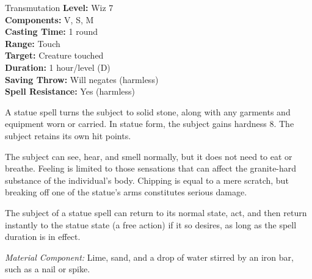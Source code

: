 {Transmutation}
{
	\textbf{Level:}
	Wiz 7\\
	\textbf{Components:}
	V, S, M\\
	\textbf{Casting Time:}
	1 round\\
	\textbf{Range:}
	Touch\\
	\textbf{Target:}
	Creature touched\\
	\textbf{Duration:}
	1 hour/level (D)\\
	\textbf{Saving Throw:}
	Will negates (harmless)\\
	\textbf{Spell Resistance:}
	Yes (harmless)\\
}
{
	A statue spell turns the subject to solid stone, along with any garments and equipment worn or carried. In statue form, the subject gains hardness 8. The subject retains its own hit points.

	The subject can see, hear, and smell normally, but it does not need to eat or breathe. Feeling is limited to those sensations that can affect the granite-hard substance of the individual's body. Chipping is equal to a mere scratch, but breaking off one of the statue's arms constitutes serious damage.

	The subject of a statue spell can return to its normal state, act, and then return instantly to the statue state (a free action) if it so desires, as long as the spell duration is in effect.

	\textit{Material Component:}
	Lime, sand, and a drop of water stirred by an iron bar, such as a nail or spike.

}
